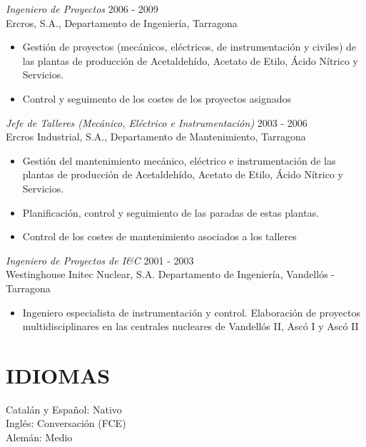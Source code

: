 \documentclass[margin]{res}
\begin{document}
\begin{resume}
{                {\sl Ingeniero de Proyectos} \hfill 2006 - 2009 \\
                Ercros, S.A.,
                Departamento de Ingeniería, Tarragona
                 \begin{itemize}  \itemsep -2pt %
                 \item Gestión de proyectos (mecánicos, eléctricos, de instrumentación y civiles) de las plantas de producción de Acetaldehído, Acetato de Etilo, Ácido Nítrico y Servicios.  
                 \item Control y seguimento de los costes de los proyectos asignados
                 \end{itemize} 

                {\sl Jefe de Talleres (Mecánico, Eléctrico e Instrumentación)} \hfill 2003 - 2006 \\
                Ercros Industrial, S.A., 
                Departamento de Mantenimiento, Tarragona 
                 \begin{itemize}  \itemsep -2pt %
                 \item Gestión del mantenimiento mecánico, eléctrico e instrumentación
                    de las plantas de producción de Acetaldehído, 
                    Acetato de Etilo, Ácido Nítrico y Servicios. 
                 \item Planificación, control y seguimiento de las paradas de estas plantas.
                 \item Control de los costes de mantenimiento asociados a los talleres
                \end{itemize}

                {\sl Ingeniero de Proyectos de I\&C} \hfill 2001 - 2003 \\
                Westinghouse Initec Nuclear, S.A. 
                Departamento de Ingeniería, Vandellós - Tarragona
                 \begin{itemize}  \itemsep -2pt %
                 \item Ingeniero especialista de instrumentación y control. Elaboración de proyectos 
                 multidisciplinares en las centrales nucleares de Vandellós II, Ascó I y Ascó II
                \end{itemize}
                 
\section{IDIOMAS}
                Catalán y Español: Nativo \\
                Inglés: Conversación (FCE) \\
                Alemán: Medio

}
\end{resume}
\end{document}
